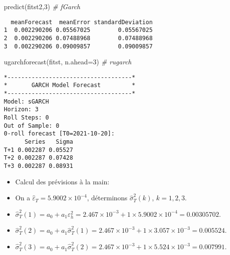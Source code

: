\documentclass[
  ignorenonframetext,
]{beamer}
\newenvironment{Shaded}{\begin{snugshade}}{\end{snugshade}}
\newcommand{\AttributeTok}[1]{\textcolor[rgb]{0.77,0.63,0.00}{#1}}
\newcommand{\CommentTok}[1]{\textcolor[rgb]{0.56,0.35,0.01}{\textit{#1}}}
\newcommand{\DecValTok}[1]{\textcolor[rgb]{0.00,0.00,0.81}{#1}}
\newcommand{\FunctionTok}[1]{\textcolor[rgb]{0.00,0.00,0.00}{#1}}
\newcommand{\NormalTok}[1]{#1}
\newenvironment{Shaded}{\begin{snugshade}}{\end{snugshade}}
\newcommand{\AttributeTok}[1]{\textcolor[rgb]{0.77,0.63,0.00}{#1}}
\newcommand{\CommentTok}[1]{\textcolor[rgb]{0.56,0.35,0.01}{\textit{#1}}}
\newcommand{\DecValTok}[1]{\textcolor[rgb]{0.00,0.00,0.81}{#1}}
\newcommand{\FunctionTok}[1]{\textcolor[rgb]{0.00,0.00,0.00}{#1}}
\newcommand{\NormalTok}[1]{#1}
\begin{document}
\begin{frame}[fragile]
\begin{Shaded}
\begin{Highlighting}[]
\FunctionTok{predict}\NormalTok{(fitst2,}\DecValTok{3}\NormalTok{)           }\CommentTok{\# fGarch}
\end{Highlighting}
\end{Shaded}
\begin{verbatim}
  meanForecast  meanError standardDeviation
1  0.002290206 0.05567025        0.05567025
2  0.002290206 0.07488968        0.07488968
3  0.002290206 0.09009857        0.09009857
\end{verbatim}
\begin{Shaded}
\begin{Highlighting}[]
\FunctionTok{ugarchforecast}\NormalTok{(fitst, }\AttributeTok{n.ahead=}\DecValTok{3}\NormalTok{)    }\CommentTok{\# rugarch}
\end{Highlighting}
\end{Shaded}
\begin{verbatim}
*------------------------------------*
*       GARCH Model Forecast         *
*------------------------------------*
Model: sGARCH
Horizon: 3
Roll Steps: 0
Out of Sample: 0
0-roll forecast [T0=2021-10-20]:
      Series   Sigma
T+1 0.002287 0.05527
T+2 0.002287 0.07428
T+3 0.002287 0.08931
\end{verbatim}
\end{frame}
\begin{frame}
\begin{itemize}[<+->]
\item
  Calcul des prévisions à la main:
\item
  On a \(\widehat{\varepsilon}_T=5.9002 \times 10^{-4}\), déterminons
  \(\widehat{\sigma}^2_T(k)\), \(k=1,2,3\).
\item
  \(\widehat{\sigma}^2_T(1)=a_0+a_1 \varepsilon^2_h=2.467 \times 10^{-3}+1\times 5.9002 \times 10^{-4}=0.00305702\).
\item
  \(\widehat{\sigma}^2_T(2)=a_0+a_1 \widehat{\sigma}^2_T(1)=2.467 \times 10^{-3}+1\times 3.057 \times 10^{-3}=0.005524\).
\item
  \(\widehat{\sigma}^2_T(3)=a_0+a_1 \widehat{\sigma}^2_T(2)=2.467 \times 10^{-3}+1\times 5.524 \times 10^{-3}=0.007991\).
\end{itemize}
\end{frame}
\end{document}

